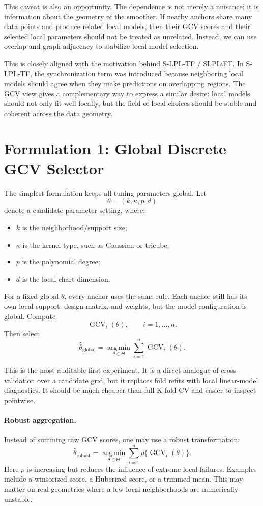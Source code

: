 \documentclass[11pt]{article}
\newcommand{\GCV}{\operatorname{GCV}}
\newcommand{\argmin}{\operatorname*{arg\,min}}
\begin{document}
This caveat is also an opportunity.  The dependence is not merely a nuisance;
it is information about the geometry of the smoother.  If nearby anchors share
many data points and produce related local models, then their GCV scores and
their selected local parameters should not be treated as unrelated.  Instead,
we can use overlap and graph adjacency to stabilize local model selection.

This is closely aligned with the motivation behind S-LPL-TF / SLPLiFT.  In
S-LPL-TF, the synchronization term was introduced because neighboring local
models should agree when they make predictions on overlapping regions.  The GCV
view gives a complementary way to express a similar desire: local models should
not only fit well locally, but the field of local choices should be stable and
coherent across the data geometry.

\section{Formulation 1: Global Discrete GCV Selector}

The simplest formulation keeps all tuning parameters global.  Let
\[
  \theta = (k,\kappa,p,d)
\]
denote a candidate parameter setting, where:

\begin{itemize}[leftmargin=*]
  \item \(k\) is the neighborhood/support size;
  \item \(\kappa\) is the kernel type, such as Gaussian or tricube;
  \item \(p\) is the polynomial degree;
  \item \(d\) is the local chart dimension.
\end{itemize}

For a fixed global \(\theta\), every anchor uses the same rule.  Each anchor
still has its own local support, design matrix, and weights, but the model
configuration is global.  Compute
\[
  \GCV_i(\theta),
  \qquad i=1,\ldots,n.
\]
Then select
\[
  \widehat\theta_{\mathrm{global}}
  =
  \argmin_{\theta\in\Theta}
  \sum_{i=1}^{n}\GCV_i(\theta).
\]

This is the most auditable first experiment.  It is a direct analogue of
cross-validation over a candidate grid, but it replaces fold refits with
local linear-model diagnostics.  It should be much cheaper than full K-fold CV
and easier to inspect pointwise.

\paragraph{Robust aggregation.}
Instead of summing raw GCV scores, one may use a robust transformation:
\[
  \widehat\theta_{\mathrm{robust}}
  =
  \argmin_{\theta\in\Theta}
  \sum_{i=1}^{n}\rho\{\GCV_i(\theta)\}.
\]
Here \(\rho\) is increasing but reduces the influence of extreme local failures.
Examples include a winsorized score, a Huberized score, or a trimmed mean.  This
may matter on real geometries where a few local neighborhoods are numerically
unstable.
\end{document}
